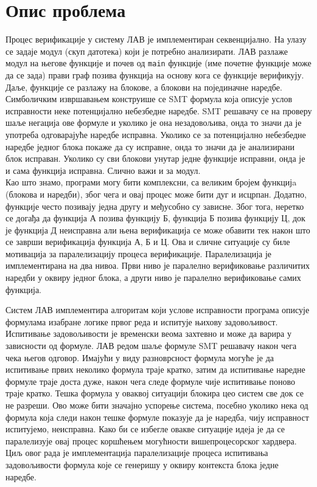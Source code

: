 \documentclass[12pt,oneside]{memoir}
\begin{document}
\section{Опис проблема}
Процес верификације у систему ЛАВ је имплементиран секвенцијално. На улазу се задаје модул (скуп датотека) који је потребно анализирати.  ЛАВ разлаже модул на његове функције и почев од \texttt{main} функције (име почетне функције може да се зада) прави граф позива функција  на основу кога се функције верификују. Даље, функције се разлажу на блокове, а блокови на појединачне наредбе. Симболичким извршавањем конструише се SMT формула која описује услов исправности неке потенцијално небезбедне наредбе. SMT решавачу се на проверу шаље негација ове формуле и уколико је она незадовољива, онда то значи да је употреба одговарајуће наредбе исправна. Уколико се за потенцијално небезбедне наредбе једног блока покаже да су исправне, онда то значи да је анализирани блок исправан. Уколико су сви блокови унутар једне функције исправни, онда је и сама функција исправна. Слично важи и за модул. 
\\
Као што знамо, програми могу бити комплексни, са великим бројем функцијa (блокова и наредби), због чега и овај процес може бити дуг и исцрпан. Додатно, функције често позивају једна другу и међусобно су зависне. Због тога, неретко се догађа да функција А позива функцију Б, функција Б позива функцију Ц, док је функција Д неисправна али њена верификација се може обавити тек након што се заврши верификација функција А, Б и Ц. Ова и сличне ситуације су биле мотивација за паралелизацију процеса верификације. Паралелизација је имплементирана на два нивоа. Први ниво је паралелно верификовање различитих наредби у оквиру једног блока, а други ниво је паралелно верификовање самих функција.

Систем ЛАВ имплементира алгоритам који услове исправности програма описује формулама изабране логике првог реда и испитује њихову задовољивост.  Испитивање задовољивости је  временски веома захтевно и може да варира у зависности од формуле. ЛАВ редом шаље формуле SMT решавачу након чега чека његов одговор. Имајући у виду разноврсност формула могуће је да испитивање првих неколико формула траје кратко, затим да испитивање наредне формуле траје доста дуже, након чега следе формуле чије испитивање поново траје кратко. Тешка формула у оваквој ситуацији блокира цео систем све док се не разреши. Ово може бити значајно успорење система, посебно уколико нека од формула која следи након тешке формуле показује да је наредба, чију исправност испитујемо, неисправна. 	
Како би се избегле овакве ситуације идеја је да се паралелизује овај процес коршћењем могућности вишепроцесорског хардвера. Циљ овог рада је имплементација паралелизације процеса испитивања задовољивости формула које се генеришу у оквиру контекста блока једне наредбе. 
\end{document}
